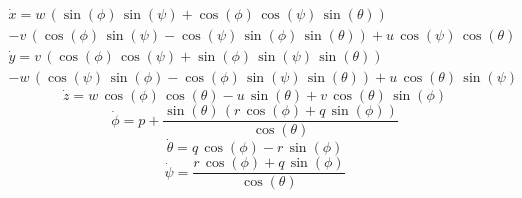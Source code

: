 \documentclass[12pt,a4]{article}
\begin{document}
\begin{multline}
	\dot{x} = w\,\left(\sin\left(\phi \right)\,\sin\left(\psi \right)+\cos\left(\phi \right)\,\cos\left(\psi \right)\,\sin\left(\theta \right)\right)\\
	-v\,\left(\cos\left(\phi \right)\,\sin\left(\psi \right)-\cos\left(\psi \right)\,\sin\left(\phi \right)\,\sin\left(\theta \right)\right)+u\,\cos\left(\psi \right)\,\cos\left(\theta \right)
\end{multline}
\begin{multline}
	\dot{y} = v\,\left(\cos\left(\phi \right)\,\cos\left(\psi \right)+\sin\left(\phi \right)\,\sin\left(\psi \right)\,\sin\left(\theta \right)\right)\\
	-w\,\left(\cos\left(\psi \right)\,\sin\left(\phi \right)-\cos\left(\phi \right)\,\sin\left(\psi \right)\,\sin\left(\theta \right)\right)+u\,\cos\left(\theta \right)\,\sin\left(\psi \right)
\end{multline}
\begin{equation*}
	\dot{z} = w\,\cos\left(\phi \right)\,\cos\left(\theta \right)-u\,\sin\left(\theta \right)+v\,\cos\left(\theta \right)\,\sin\left(\phi \right)
\end{equation*}
\begin{equation*}
	\dot{\phi} = p+\frac{\sin\left(\theta \right)\,\left(r\,\cos\left(\phi \right)+q\,\sin\left(\phi \right)\right)}{\cos\left(\theta \right)}
\end{equation*}
\begin{equation*}
	\dot{\theta} = q\,\cos\left(\phi \right)-r\,\sin\left(\phi \right)
\end{equation*}
\begin{equation*}
	\dot{\psi} = \frac{r\,\cos\left(\phi \right)+q\,\sin\left(\phi \right)}{\cos\left(\theta \right)}
\end{equation*}
\end{document}
